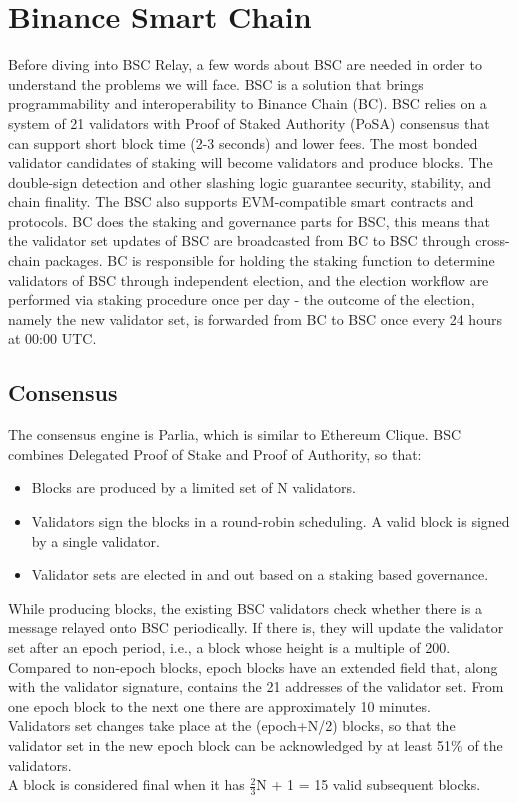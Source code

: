 \section{Binance Smart Chain}
Before diving into BSC Relay, a few words about BSC are needed in order to understand the problems we will face.
BSC is a solution that brings programmability and interoperability to Binance Chain (BC). BSC relies on a system of 21 validators with Proof of Staked Authority (PoSA) consensus that can support short block time (2-3 seconds) and lower fees. The most bonded validator candidates of staking will become validators and produce blocks. The double-sign detection and other slashing logic guarantee security, stability, and chain finality. The BSC also supports EVM-compatible smart contracts and protocols.
\noindent
BC does the staking and governance parts for BSC, this means that the validator set updates of BSC are broadcasted from BC to BSC through cross-chain packages. BC is responsible for holding the staking function to determine validators of BSC through independent election, and the election workflow are performed via staking procedure once per day - the outcome of the election, namely the new validator set, is forwarded from BC to BSC once every 24 hours at 00:00 UTC.

\subsection{Consensus}
The consensus engine is Parlia, which is similar to Ethereum Clique. BSC combines Delegated Proof of Stake and Proof of Authority, so that:
\begin{itemize}
	\item Blocks are produced by a limited set of N validators.
	\item Validators sign the blocks in a round-robin scheduling. A valid block is signed by a single validator.
	\item Validator sets are elected in and out based on a staking based governance.
\end{itemize}
\noindent
While producing blocks, the existing BSC validators check whether there is a \ValidatorSetUpdate message relayed onto BSC periodically. If there is, they will update the validator set after an epoch period, i.e., a block whose height is a multiple of 200. Compared to non-epoch blocks, epoch blocks have an extended \extradata field that, along with the validator signature, contains the 21 addresses of the validator set. From one epoch block to the next one there are approximately 10 minutes.\\Validators set changes take place at the (epoch+N/2) blocks, so that the validator set in the new epoch block can be acknowledged by at least 51\% of the validators. \\ A block is considered final when it has $\frac{2}{3}$N + 1 = 15 valid subsequent blocks. 
